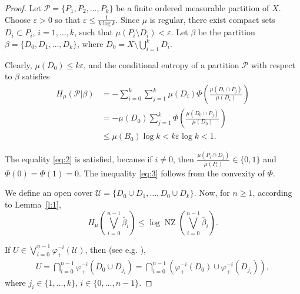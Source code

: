 \documentclass[12pt]{amsart}
\theoremstyle{definition}
\newcommand{\U}{\mathcal{U}}
\renewcommand{\P}{{\mathcal{P}}}
\newcommand{\vp}{\varphi}
\newcommand{\B}{{\mathcal{B}}}
\newcommand{\ep}{{\varepsilon}}
\newcommand{\NZ}{\operatorname{NZ}}
\begin{document}
\begin{proof}

Let $\P=\{P_1,P_2,\ldots, P_k\}$ be a finite ordered measurable partition of $X$. Choose $\ep>0$ so that $\ep\leq \frac1{k \log k}$. Since $\mu$ is regular, there exist compact sets $D_i\subset P_i$, $i=1,\ldots,k$, such that $\mu(P_i\setminus D_i)<\ep$. Let $\beta$ be the partition $\beta=\{D_0,D_1,\ldots,D_k\}$, where $D_0= X\setminus\bigcup_{i=1}^{k} D_i$.

Clearly, $\mu(D_0) \leq k\ep$, and the conditional entropy of a partition $\P$ with respect to $\beta$ satisfies
\begin{align}
H_{\mu}(\P\vert\beta) &= -\sum_{i=0}^{k}\sum_{j=1}^{k} \mu(D_i)\Phi\left(\frac{\mu(D_i\cap P_j)}{\mu(D_i)}\right)\nonumber \\ 
&= - \mu(D_0)\sum_{j=1}^{k} \Phi\left( \frac{\mu(D_0\cap P_j)}{\mu(D_0)}\right)  \label{eq:2} \\ 
&\leq \mu(B_0)\log k < k\ep \log k < 1. \label{eq:3}
\end{align}

The equality \eqref{eq:2} is satisfied, because if $i\neq 0$, then $\frac{\mu(P_i\cap D_j)}{\mu(P_i)} \in\{0,1\}$ and $\Phi(0)=\Phi(1)=0$. The inequality \eqref{eq:3} follows from the convexity of $\Phi$.

We define an open cover $\U=\{D_0\cup D_1,\ldots,D_0\cup D_k\}$. Now, for $n\geq 1$, according to Lemma~\ref{l:1},
\[
H_{\mu}(\bigvee_{i=0}^{n-1} \tilde{\beta_i}) \leq \log \NZ(\bigvee_{i=0}^{n-1} \tilde{\beta_i}).
\]

If $U\in\bigvee_{i=0}^{n-1} \vp^{-i}_{+}(\U)$, then (see e.g. \cite[Proposition 1.2.2]{HP}),
\begin{align*}
U = \bigcap_{i=0}^{n-1} \vp_{+}^{-i}(D_0\cup D_{j_i}) = \bigcap_{i=0}^{n-1} \left(\vp_{+}^{-i}(D_0)\cup\vp_{+}^{-i}(D_{j_i})\right),
\end{align*}
where $j_i\in \{1,\ldots,k\}$, $i\in\{0,\ldots,n-1\}$.


\end{proof}
\end{document}

